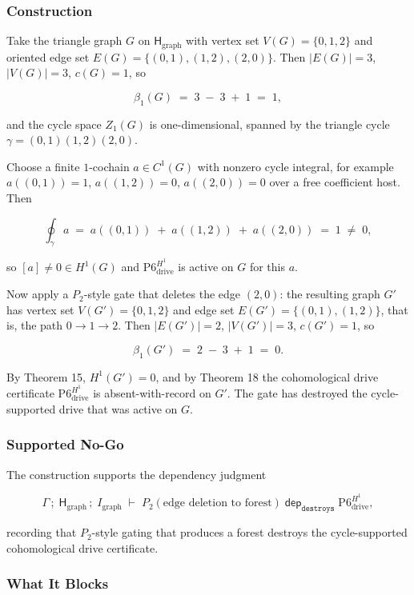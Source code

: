 \documentclass[11pt]{article}
\theoremstyle{definition}
\begin{document}
\subsubsection{Construction}

Take the triangle graph \(G\) on \(\mathsf H_{\mathrm{graph}}\) with vertex set \(V(G)=\{0,1,2\}\) and oriented edge set \(E(G)=\{(0,1),(1,2),(2,0)\}\). Then \(|E(G)|=3\), \(|V(G)|=3\), \(c(G)=1\), so

\[
\beta_1(G)\;=\;3\;-\;3\;+\;1\;=\;1,
\]

and the cycle space \(Z_1(G)\) is one-dimensional, spanned by the triangle cycle \(\gamma=(0,1)(1,2)(2,0)\).

Choose a finite \(1\)-cochain \(a\in C^1(G)\) with nonzero cycle integral, for example \(a((0,1))=1\), \(a((1,2))=0\), \(a((2,0))=0\) over a free coefficient host. Then

\[
\oint_\gamma a\;=\;a((0,1))\;+\;a((1,2))\;+\;a((2,0))\;=\;1\;\neq\;0,
\]

so \([a]\neq 0\in H^1(G)\) and \(\mathrm{P6}_{\mathrm{drive}}^{H^1}\) is active on \(G\) for this \(a\).

Now apply a \(P_2\)-style gate that deletes the edge \((2,0)\): the resulting graph \(G'\) has vertex set \(V(G')=\{0,1,2\}\) and edge set \(E(G')=\{(0,1),(1,2)\}\), that is, the path \(0\to 1\to 2\). Then \(|E(G')|=2\), \(|V(G')|=3\), \(c(G')=1\), so

\[
\beta_1(G')\;=\;2\;-\;3\;+\;1\;=\;0.
\]

By Theorem 15, \(H^1(G')=0\), and by Theorem 18 the cohomological drive certificate \(\mathrm{P6}_{\mathrm{drive}}^{H^1}\) is absent-with-record on \(G'\). The gate has destroyed the cycle-supported drive that was active on \(G\).

\subsubsection{Supported No-Go}

The construction supports the dependency judgment

\[
\Gamma\,;\;\mathsf H_{\mathrm{graph}}\,;\;I_{\mathrm{graph}}\;\vdash\;P_2(\text{edge deletion to forest})\;\mathrel{\mathsf{dep}_{\texttt{destroys}}}\;\mathrm{P6}_{\mathrm{drive}}^{H^1},
\]

recording that \(P_2\)-style gating that produces a forest destroys the cycle-supported cohomological drive certificate.

\subsubsection{What It Blocks}
\end{document}
